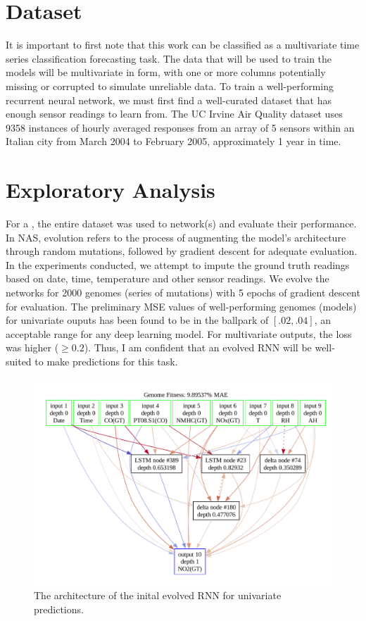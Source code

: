 \documentclass[12pt]{article}
\begin{document}
\section{Dataset}
It is important to first note that this work can be classified as a multivariate time series classification forecasting task. The data that will be used to train the models will be multivariate in form, with one or more columns potentially missing or corrupted to simulate unreliable data.
To train a well-performing recurrent neural network, we must first find a well-curated dataset that has enough sensor readings to learn from. The UC Irvine Air Quality dataset \cite{misc_air_quality_360} uses 9358 instances of hourly averaged responses from an array of 5 sensors within an Italian city from March 2004 to February 2005, approximately 1 year in time.

\section{Exploratory Analysis}
For a , the entire dataset was used to  network(s) and evaluate their performance. In NAS, evolution refers to the process of augmenting the model's architecture through random mutations, followed by gradient descent for adequate evaluation. In the experiments conducted, we attempt to impute the ground truth readings based on date, time, temperature and other sensor readings. We evolve the networks for 2000 genomes (series of mutations) with 5 epochs of gradient descent for evaluation. The preliminary MSE values of well-performing genomes (models) for univariate ouputs has been found to be in the ballpark of $[.02,.04]$, an acceptable range for any deep learning model. For multivariate outputs, the loss was higher ($\geq 0.2$). Thus, I am confident that an evolved RNN will be well-suited to make predictions for this task. 

\begin{figure}
    \includegraphics[width=\linewidth]{resources/init_genome.png}
    \caption{The architecture of the inital evolved RNN for univariate predictions.}
\end{figure}
\end{document}
